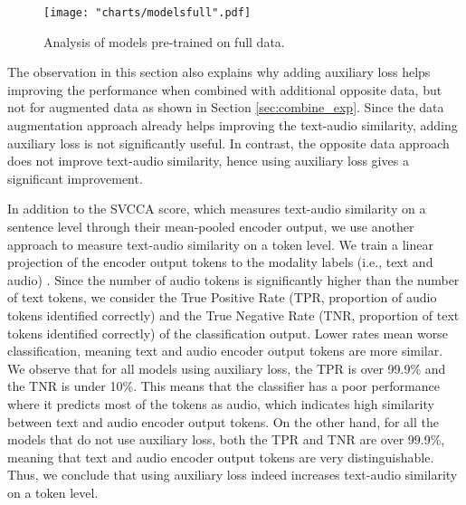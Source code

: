 \documentclass[conference]{IEEEtran}
\begin{document}
	\begin{figure}[htbp]
		\centerline{\texttt{[image: "charts/modelsfull".pdf]}}
		\caption{Analysis of models pre-trained on full data.}
		\label{fig:modelsfull}
	\end{figure}
	
	
	The observation in this section also explains why adding auxiliary loss helps improving the performance when combined with additional opposite data, but not for augmented data as shown in Section \ref{sec:combine_exp}. Since the data augmentation approach already helps improving the text-audio similarity, adding auxiliary loss is not significantly useful. In contrast, the opposite data approach does not improve text-audio similarity, hence using auxiliary loss gives a significant improvement.
	
	In addition to the SVCCA score, which measures text-audio similarity on a sentence level through their mean-pooled encoder output, we use another approach to measure text-audio similarity on a token level. We train a linear projection of the encoder output tokens to the modality labels (i.e., text and audio) \cite{DEPI}. Since the number of audio tokens is significantly higher than the number of text tokens, we consider the True Positive Rate (TPR, proportion of audio tokens identified correctly) and the True Negative Rate (TNR, proportion of text tokens identified correctly) of the classification output. Lower rates mean worse classification, meaning text and audio encoder output tokens are more similar. We observe that for all models using auxiliary loss, the TPR is over 99.9\% and the TNR is under 10\%. This means that the classifier has a poor performance where it predicts most of the tokens as audio, which indicates high similarity between text and audio encoder output tokens. On the other hand, for all the models that do not use auxiliary loss, both the TPR and TNR are over 99.9\%, meaning that text and audio encoder output tokens are very distinguishable. Thus, we conclude that using auxiliary loss indeed increases text-audio similarity on a token level.
	
\end{document}

